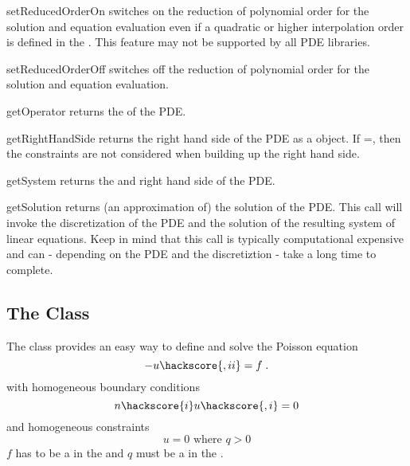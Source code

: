 \begin{methoddesc}[LinearPDE]{setReducedOrderOn}{}
switches on the reduction of polynomial order for the solution and equation evaluation even if
a quadratic or higher interpolation order is defined in the \Domain. This feature may not
be supported by all PDE libraries.
\end{methoddesc}

\begin{methoddesc}[LinearPDE]{setReducedOrderOff}{}
switches off the reduction of polynomial order for the solution and
equation evaluation.
\end{methoddesc}

\begin{methoddesc}[LinearPDE]{getOperator}{}
returns the \Operator of the PDE.
\end{methoddesc}

\begin{methoddesc}[LinearPDE]{getRightHandSide}{}
returns the right hand side of the PDE as a \Data object. If
=\True, then the constraints are not considered
when building up the right hand side.
\end{methoddesc}

\begin{methoddesc}[LinearPDE]{getSystem}{}
returns the \Operator and right hand side of the PDE.
\end{methoddesc}

\begin{methoddesc}[LinearPDE]{getSolution}{}
returns (an approximation of) the solution of the PDE. This call
will invoke the discretization of the PDE and the solution of the resulting
system of linear equations. Keep in mind that this call is typically computational 
expensive and can - depending on the PDE and the discretiztion - take a long time to complete. 
\end{methoddesc}



\subsection{The \Poisson Class}
The \Poisson class provides an easy way to define and solve the Poisson
equation
\begin{equation}\label{POISSON.1}
-u\hackscore{,ii}=f\; .
\end{equation}
with homogeneous boundary conditions
\begin{equation}\label{POISSON.2}
n\hackscore{i}u\hackscore{,i}=0
\end{equation}
and homogeneous constraints
\begin{equation}\label{POISSON.3}
u=0 \mbox{ where } q>0
\end{equation}
$f$ has to be a \Scalar in the \Function and $q$ must be
a \Scalar in  the \SolutionFS.

